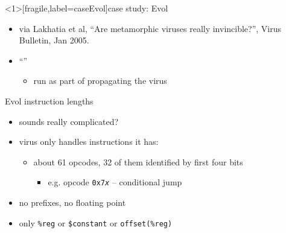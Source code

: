 \begin{frame}<1>[fragile,label=caseEvol]{case study: Evol}
    \begin{itemize}
    \item via Lakhatia et al, ``Are metamorphic viruses really invincible?'', Virus Bulletin, Jan 2005.
    \item ``''
        \begin{itemize}
        \item run as part of propagating the virus
        \end{itemize}
    \end{itemize}
\end{frame}


\begin{frame}{Evol instruction lengths}
    \begin{itemize}
    \item sounds really complicated?
    \item virus only handles instructions it has:
        \begin{itemize}
        \item about 61 opcodes, 32 of them identified by first four bits
            \begin{itemize}
            \item e.g. opcode {\tt 0x7\textit{x}} -- conditional jump
            \end{itemize}
        \end{itemize}
    \item no prefixes, no floating point
    \item only {\tt \%reg} or {\tt \$constant} or {\tt offset(\%reg)}
    \end{itemize}
\end{frame}

